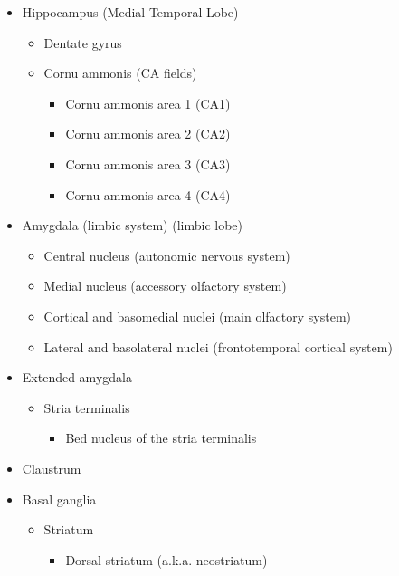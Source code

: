 \begin{itemize}
\tightlist
\item
  Hippocampus (Medial Temporal Lobe)

  \begin{itemize}
  \tightlist
  \item
    Dentate gyrus
  \item
    Cornu ammonis (CA fields)

    \begin{itemize}
    \tightlist
    \item
      Cornu ammonis area 1 (CA1)
    \item
      Cornu ammonis area 2 (CA2)
    \item
      Cornu ammonis area 3 (CA3)
    \item
      Cornu ammonis area 4 (CA4)
    \end{itemize}
  \end{itemize}
\item
  Amygdala (limbic system) (limbic lobe)

  \begin{itemize}
  \tightlist
  \item
    Central nucleus (autonomic nervous system)
  \item
    Medial nucleus (accessory olfactory system)
  \item
    Cortical and basomedial nuclei (main olfactory system)
  \item
    Lateral and basolateral nuclei (frontotemporal cortical system)
  \end{itemize}
\item
  Extended amygdala

  \begin{itemize}
  \tightlist
  \item
    Stria terminalis

    \begin{itemize}
    \tightlist
    \item
      Bed nucleus of the stria terminalis
    \end{itemize}
  \end{itemize}
\item
  Claustrum
\item
  Basal ganglia

  \begin{itemize}
  \tightlist
  \item
    Striatum

    \begin{itemize}
    \tightlist
    \item
      Dorsal striatum (a.k.a. neostriatum)


\end{itemize}
\end{itemize}
\end{itemize}
